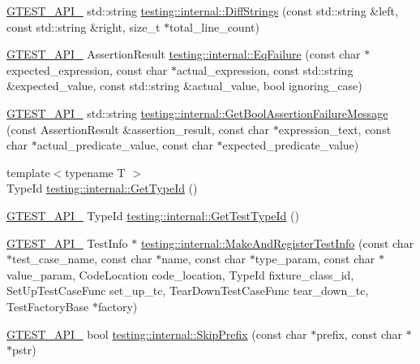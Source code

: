 \begin{DoxyCompactItemize}
\hyperlink{gtest-port_8h_aa73be6f0ba4a7456180a94904ce17790}{G\+T\+E\+S\+T\+\_\+\+A\+P\+I\+\_\+} std\+::string \hyperlink{namespacetesting_1_1internal_a513107ff8defa97d949937fc1350a56c}{testing\+::internal\+::\+Diff\+Strings} (const std\+::string \&left, const std\+::string \&right, size\+\_\+t $\ast$total\+\_\+line\+\_\+count)
\item 
\hyperlink{gtest-port_8h_aa73be6f0ba4a7456180a94904ce17790}{G\+T\+E\+S\+T\+\_\+\+A\+P\+I\+\_\+} Assertion\+Result \hyperlink{namespacetesting_1_1internal_a08725846ff184d3e79bcf5be4df19157}{testing\+::internal\+::\+Eq\+Failure} (const char $\ast$expected\+\_\+expression, const char $\ast$actual\+\_\+expression, const std\+::string \&expected\+\_\+value, const std\+::string \&actual\+\_\+value, bool ignoring\+\_\+case)
\item 
\hyperlink{gtest-port_8h_aa73be6f0ba4a7456180a94904ce17790}{G\+T\+E\+S\+T\+\_\+\+A\+P\+I\+\_\+} std\+::string \hyperlink{namespacetesting_1_1internal_a5fd6e5dc9eb20ab3c3a80e24d89dfac6}{testing\+::internal\+::\+Get\+Bool\+Assertion\+Failure\+Message} (const Assertion\+Result \&assertion\+\_\+result, const char $\ast$expression\+\_\+text, const char $\ast$actual\+\_\+predicate\+\_\+value, const char $\ast$expected\+\_\+predicate\+\_\+value)
\item 
{\footnotesize template$<$typename T $>$ }\\Type\+Id \hyperlink{namespacetesting_1_1internal_a6b108e56fdc68ea937ffb3759fb55ab0}{testing\+::internal\+::\+Get\+Type\+Id} ()
\item 
\hyperlink{gtest-port_8h_aa73be6f0ba4a7456180a94904ce17790}{G\+T\+E\+S\+T\+\_\+\+A\+P\+I\+\_\+} Type\+Id \hyperlink{namespacetesting_1_1internal_ad0d66d56ead224263cd100c1d6bfc562}{testing\+::internal\+::\+Get\+Test\+Type\+Id} ()
\item 
\hyperlink{gtest-port_8h_aa73be6f0ba4a7456180a94904ce17790}{G\+T\+E\+S\+T\+\_\+\+A\+P\+I\+\_\+} Test\+Info $\ast$ \hyperlink{namespacetesting_1_1internal_a7f2e4e46c969fcae9d801d93a3e932fd}{testing\+::internal\+::\+Make\+And\+Register\+Test\+Info} (const char $\ast$test\+\_\+case\+\_\+name, const char $\ast$name, const char $\ast$type\+\_\+param, const char $\ast$value\+\_\+param, Code\+Location code\+\_\+location, Type\+Id fixture\+\_\+class\+\_\+id, Set\+Up\+Test\+Case\+Func set\+\_\+up\+\_\+tc, Tear\+Down\+Test\+Case\+Func tear\+\_\+down\+\_\+tc, Test\+Factory\+Base $\ast$factory)
\item 
\hyperlink{gtest-port_8h_aa73be6f0ba4a7456180a94904ce17790}{G\+T\+E\+S\+T\+\_\+\+A\+P\+I\+\_\+} bool \hyperlink{namespacetesting_1_1internal_a244d9a3765727306b597b8992ab84036}{testing\+::internal\+::\+Skip\+Prefix} (const char $\ast$prefix, const char $\ast$$\ast$pstr)
$$
\end{DoxyCompactItemize}
